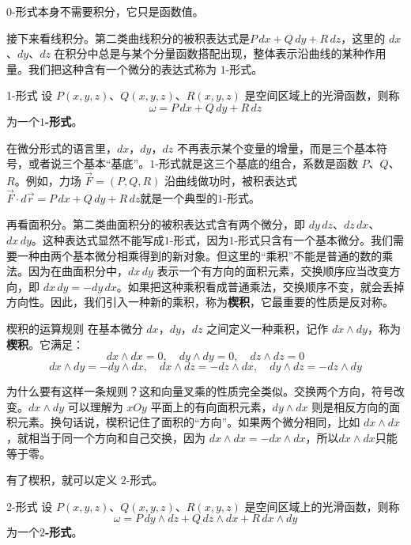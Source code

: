 $0$-形式本身不需要积分，它只是函数值。

接下来看线积分。第二类曲线积分的被积表达式是\(P\,dx+Q\,dy+R\,dz\)，这里的 \(dx\)、\(dy\)、\(dz\) 在积分中总是与某个分量函数搭配出现，整体表示沿曲线的某种作用量。我们把这种含有一个微分的表达式称为 $1$-形式。

\begin{definition}{1-形式}{}
设 \(P(x,y,z)\)、\(Q(x,y,z)\)、\(R(x,y,z)\) 是空间区域上的光滑函数，则称
\[
\omega=P\,dx+Q\,dy+R\,dz
\]
为一个\textbf{$1$-形式}。
\end{definition}

在微分形式的语言里，\(dx\)，\(dy\)，\(dz\) 不再表示某个变量的增量，而是三个基本符号，或者说三个基本“基底”。$1$-形式就是这三个基底的组合，系数是函数 \(P\)、\(Q\)、\(R\)。例如，力场 \(\vec{F}=(P,Q,R)\) 沿曲线做功时，被积表达式\(\vec{F}\cdot d\vec{r}=P\,dx+Q\,dy+R\,dz\)就是一个典型的$1$-形式。

再看面积分。第二类曲面积分的被积表达式含有两个微分，即 $dy\,dz$、$dz\,dx$、$dx\,dy$。这种表达式显然不能写成$1$-形式，因为$1$-形式只含有一个基本微分。我们需要一种由两个基本微分相乘得到的新对象。但这里的“乘积”不能是普通的数的乘法。因为在曲面积分中，\(dx\,dy\) 表示一个有方向的面积元素，交换顺序应当改变方向，即 \(dx\,dy=-dy\,dx\)。如果把这种乘积看成普通乘法，交换顺序不变，就会丢掉方向性。因此，我们引入一种新的乘积，称为\textbf{楔积}，它最重要的性质是反对称。

\begin{definition}{楔积的运算规则}{}
  在基本微分 \(dx\)，\(dy\)，\(dz\) 之间定义一种乘积，记作 \(dx\wedge dy\)，称为\textbf{楔积}。它满足：
\[
dx\wedge dx=0,\quad dy\wedge dy=0,\quad dz\wedge dz=0
\]
\[
dx\wedge dy=-dy\wedge dx,\quad dx\wedge dz=-dz\wedge dx,\quad dy\wedge dz=-dz\wedge dy
\]
\end{definition}

为什么要有这样一条规则？这和向量叉乘的性质完全类似。交换两个方向，符号改变。$dx\wedge dy$ 可以理解为 $xOy$ 平面上的有向面积元素，$dy\wedge dx$ 则是相反方向的面积元素。换句话说，楔积记住了面积的“方向”。如果两个微分相同，比如 $dx\wedge dx$，就相当于同一个方向和自己交换，因为 $dx\wedge dx=-dx\wedge dx$，所以$dx\wedge dx$只能等于零。

有了楔积，就可以定义 $2$-形式。

\begin{definition}{2-形式}{}
设 \(P(x,y,z)\)、\(Q(x,y,z)\)、\(R(x,y,z)\) 是空间区域上的光滑函数，则称
\[
\omega=P\,dy\wedge dz+Q\,dz\wedge dx+R\,dx\wedge dy
\]
为一个\textbf{$2$-形式}。
\end{definition}

